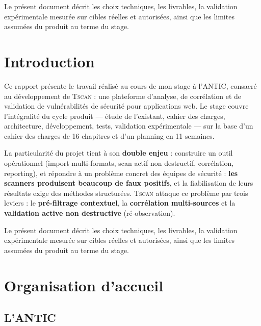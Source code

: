 \documentclass[11pt,a4paper]{report}
\newcommand{\tscan}{\textsc{Tscan}}
\begin{document}
Le présent document décrit les choix techniques, les livrables, la validation
expérimentale mesurée sur cibles réelles et autorisées, ainsi que les limites assumées du
produit au terme du stage.

\cleardoublepage
{}
\listoffigures
\listoftables

\chapter{Introduction}

Ce rapport présente le travail réalisé au cours de mon stage à l'ANTIC, consacré au
développement de \tscan{} : une plateforme d'analyse, de corrélation et de validation de
vulnérabilités de sécurité pour applications web. Le stage couvre l'intégralité du cycle
produit --- étude de l'existant, cahier des charges, architecture, développement, tests,
validation expérimentale --- sur la base d'un cahier des charges de 16 chapitres et d'un
planning en 11 semaines.

La particularité du projet tient à son \textbf{double enjeu} : construire un outil
opérationnel (import multi-formats, scan actif non destructif, corrélation, reporting), et
répondre à un problème concret des équipes de sécurité : \textbf{les scanners produisent
beaucoup de faux positifs}, et la fiabilisation de leurs résultats exige des méthodes
structurées. \tscan{} attaque ce problème par trois leviers : le \textbf{pré-filtrage
contextuel}, la \textbf{corrélation multi-sources} et la \textbf{validation active non
destructive} (ré-observation).

Le présent document décrit les choix techniques, les livrables, la validation
expérimentale mesurée sur cibles réelles et autorisées, ainsi que les limites assumées du
produit au terme du stage.

\chapter{Organisation d'accueil}

\section{L'ANTIC}
\end{document}
